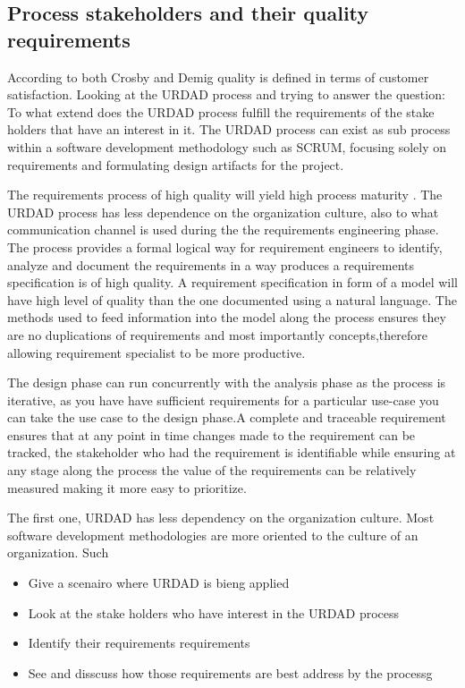 
\subsection{Process stakeholders and their quality requirements}

According to both Crosby and Demig quality is defined in terms of customer satisfaction. Looking at the URDAD process and trying to answer the 
question: To what extend does the URDAD process fulfill the requirements of the stake holders that have an interest in it. The URDAD process can
exist as sub process within a software development methodology such as SCRUM, focusing solely on requirements and formulating design 
artifacts for the project.


The requirements process of high quality will yield high process maturity \cite  {boehm_view_2006}. The URDAD process has
less dependence on the organization culture, also to what communication channel is used during the the requirements 
engineering phase. The process provides a formal logical way for requirement engineers to identify, analyze and document 
the requirements in a way produces a requirements specification is of high quality. A requirement specification in form of a model will 
have high level of quality than the one documented using a natural language. The methods used to feed information into the model along the process 
ensures they are no duplications of requirements and most importantly concepts,therefore allowing requirement specialist to be more productive. 


The design phase can run concurrently with the analysis phase as the process is iterative, as you have have sufficient requirements for a 
particular use-case you can take the use case to the design phase.A complete and traceable requirement ensures that at any point in time
changes made to the requirement can be tracked, the stakeholder who had the requirement is identifiable while ensuring at any stage along 
the process the value of the requirements can be relatively measured making it more easy to prioritize.\cite {gilb_paper:_2010}


The first one, URDAD has less dependency on the organization culture. Most software development methodologies are more oriented to the culture of an organization. Such 


\begin {itemize}
 \item Give a scenairo where URDAD is bieng applied
 \item Look at the stake holders who have interest in the URDAD process 
 \item Identify their requirements requirements
 \item See and disscuss how those requirements are best address by the processg
\end {itemize}

